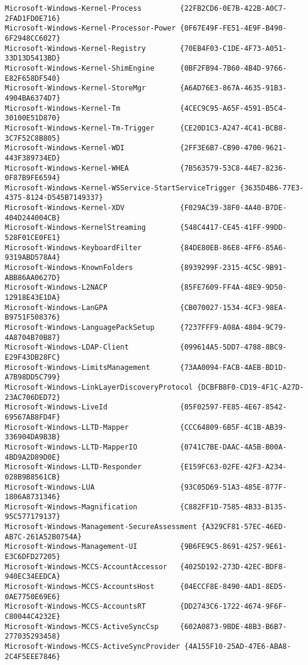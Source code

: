 \documentclass{report}
\begin{document}
\begin{lstlisting}[breaklines=true,basicstyle=\tiny]
Microsoft-Windows-Kernel-Process         {22FB2CD6-0E7B-422B-A0C7-2FAD1FD0E716}
Microsoft-Windows-Kernel-Processor-Power {0F67E49F-FE51-4E9F-B490-6F2948CC6027}
Microsoft-Windows-Kernel-Registry        {70EB4F03-C1DE-4F73-A051-33D13D5413BD}
Microsoft-Windows-Kernel-ShimEngine      {0BF2FB94-7B60-4B4D-9766-E82F658DF540}
Microsoft-Windows-Kernel-StoreMgr        {A6AD76E3-867A-4635-91B3-4904BA6374D7}
Microsoft-Windows-Kernel-Tm              {4CEC9C95-A65F-4591-B5C4-30100E51D870}
Microsoft-Windows-Kernel-Tm-Trigger      {CE20D1C3-A247-4C41-BCB8-3C7F52C8B805}
Microsoft-Windows-Kernel-WDI             {2FF3E6B7-CB90-4700-9621-443F389734ED}
Microsoft-Windows-Kernel-WHEA            {7B563579-53C8-44E7-8236-0F87B9FE6594}
Microsoft-Windows-Kernel-WSService-StartServiceTrigger {3635D4B6-77E3-4375-8124-D545B7149337}
Microsoft-Windows-Kernel-XDV             {F029AC39-38F0-4A40-B7DE-404D244004CB}
Microsoft-Windows-KernelStreaming        {548C4417-CE45-41FF-99DD-528F01CE0FE1}
Microsoft-Windows-KeyboardFilter         {84DE80EB-86E8-4FF6-85A6-9319ABD578A4}
Microsoft-Windows-KnownFolders           {8939299F-2315-4C5C-9B91-ABB86AA0627D}
Microsoft-Windows-L2NACP                 {85FE7609-FF4A-48E9-9D50-12918E43E1DA}
Microsoft-Windows-LanGPA                 {CB070027-1534-4CF3-98EA-B9751F508376}
Microsoft-Windows-LanguagePackSetup      {7237FFF9-A08A-4804-9C79-4A8704B70B87}
Microsoft-Windows-LDAP-Client            {099614A5-5DD7-4788-8BC9-E29F43DB28FC}
Microsoft-Windows-LimitsManagement       {73AA0094-FACB-4AEB-BD1D-A7B98DD5C799}
Microsoft-Windows-LinkLayerDiscoveryProtocol {DCBFB8F0-CD19-4F1C-A27D-23AC706DED72}
Microsoft-Windows-LiveId                 {05F02597-FE85-4E67-8542-69567AB8FD4F}
Microsoft-Windows-LLTD-Mapper            {CCC64809-6B5F-4C1B-AB39-336904DA9B3B}
Microsoft-Windows-LLTD-MapperIO          {0741C7BE-DAAC-4A5B-B00A-4BD9A2D89D0E}
Microsoft-Windows-LLTD-Responder         {E159FC63-02FE-42F3-A234-028B9B8561CB}
Microsoft-Windows-LUA                    {93C05D69-51A3-485E-877F-1806A8731346}
Microsoft-Windows-Magnification          {C882FF1D-7585-4B33-B135-95C577179137}
Microsoft-Windows-Management-SecureAssessment {A329CF81-57EC-46ED-AB7C-261A52B0754A}
Microsoft-Windows-Management-UI          {9B6FE9C5-8691-4257-9E61-E3C6DFD27205}
Microsoft-Windows-MCCS-AccountAccessor   {4025D192-273D-42EC-BDF8-940EC34EEDCA}
Microsoft-Windows-MCCS-AccountsHost      {04ECCF8E-8490-4AD1-8ED5-0AE7750E69E6}
Microsoft-Windows-MCCS-AccountsRT        {DD2743C6-1722-4674-9F6F-C80044C4232E}
Microsoft-Windows-MCCS-ActiveSyncCsp     {602A0873-9BDE-48B3-B6B7-277035293458}
Microsoft-Windows-MCCS-ActiveSyncProvider {4A155F10-25AD-47E6-ABA8-2C4F5EEE7846}

\end{lstlisting}
\end{document}
